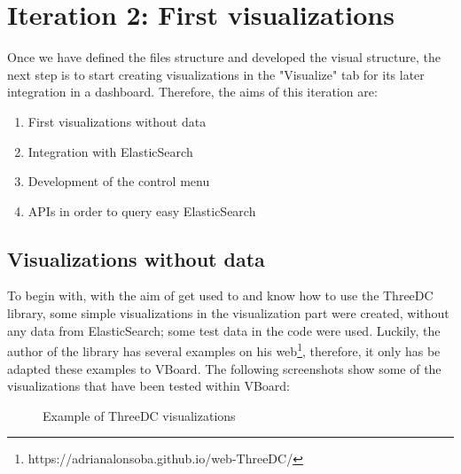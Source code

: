 \documentclass[a4paper, 12pt]{book}
\begin{document}
\section{Iteration 2: First visualizations}

Once we have defined the files structure and developed the visual structure, the next step is to start creating visualizations in the "Visualize" tab for its later integration in a dashboard. Therefore, the aims of this iteration are:

\begin{enumerate}
\item First visualizations without data
\item Integration with ElasticSearch
\item Development of the control menu
\item APIs in order to query easy ElasticSearch
\end{enumerate}

\subsection{Visualizations without data}

To begin with, with the aim of get used to and know how to use the ThreeDC library, some simple visualizations in the visualization part were created, without any data from ElasticSearch; some test data in the code were used. Luckily, the author of the library has several examples on his web\footnote{https://adrianalonsoba.github.io/web-ThreeDC/}, therefore, it only has be adapted these examples to VBoard. The following screenshots show some of the visualizations that have been tested within VBoard:



\begin{figure}[H]
 \centering
 \caption{Example of ThreeDC visualizations}
 \label{f:threedcexamples}
\end{figure}
\end{document}
